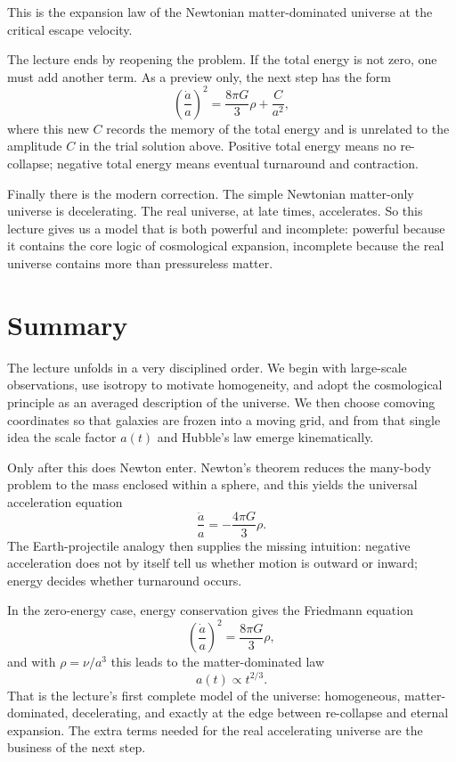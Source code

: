 This is the expansion law of the Newtonian matter-dominated universe at the critical escape velocity.

The lecture ends by reopening the problem. If the total energy is not zero, one must add another term. As a preview only, the next step has the form
\begin{equation}
\left(\frac{\dot a}{a}\right)^2=\frac{8\pi G}{3}\rho+\frac{C}{a^2},
\end{equation}
where this new \(C\) records the memory of the total energy and is unrelated to the amplitude \(C\) in the trial solution above. Positive total energy means no re-collapse; negative total energy means eventual turnaround and contraction.

Finally there is the modern correction. The simple Newtonian matter-only universe is decelerating. The real universe, at late times, accelerates. So this lecture gives us a model that is both powerful and incomplete: powerful because it contains the core logic of cosmological expansion, incomplete because the real universe contains more than pressureless matter.

\section{Summary}

The lecture unfolds in a very disciplined order. We begin with large-scale observations, use isotropy to motivate homogeneity, and adopt the cosmological principle as an averaged description of the universe. We then choose comoving coordinates so that galaxies are frozen into a moving grid, and from that single idea the scale factor \(a(t)\) and Hubble's law emerge kinematically.

Only after this does Newton enter. Newton's theorem reduces the many-body problem to the mass enclosed within a sphere, and this yields the universal acceleration equation
\begin{equation}
\frac{\ddot a}{a}=-\frac{4\pi G}{3}\rho.
\end{equation}
The Earth-projectile analogy then supplies the missing intuition: negative acceleration does not by itself tell us whether motion is outward or inward; energy decides whether turnaround occurs.

In the zero-energy case, energy conservation gives the Friedmann equation
\begin{equation}
\left(\frac{\dot a}{a}\right)^2=\frac{8\pi G}{3}\rho,
\end{equation}
and with \(\rho=\nu/a^3\) this leads to the matter-dominated law
\begin{equation}
a(t)\propto t^{2/3}.
\end{equation}
That is the lecture's first complete model of the universe: homogeneous, matter-dominated, decelerating, and exactly at the edge between re-collapse and eternal expansion. The extra terms needed for the real accelerating universe are the business of the next step.